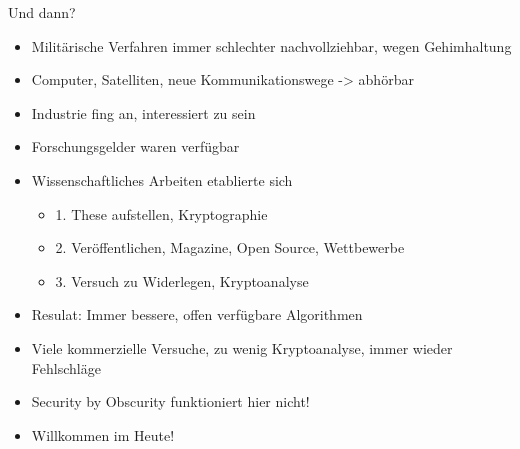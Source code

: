   \begin{frame}{Und dann?}
    \begin{itemize}
      \item{Militärische Verfahren immer schlechter nachvollziehbar, wegen Gehimhaltung}
      \item{Computer, Satelliten, neue Kommunikationswege -> abhörbar}
      \item{Industrie fing an, interessiert zu sein}
      \item{Forschungsgelder waren verfügbar}
      \item{Wissenschaftliches Arbeiten etablierte sich}
      \begin{itemize}
        \item{1. These aufstellen, Kryptographie}
        \item{2. Veröffentlichen, Magazine, Open Source, Wettbewerbe}
        \item{3. Versuch zu Widerlegen, Kryptoanalyse}
      \end{itemize}
      \item{Resulat: Immer bessere, offen verfügbare Algorithmen}
      \item{Viele kommerzielle Versuche, zu wenig Kryptoanalyse, immer wieder Fehlschläge}
      \item{Security by Obscurity funktioniert hier nicht!}
      \item{Willkommen im Heute!}
    \end{itemize}
  \end{frame}
